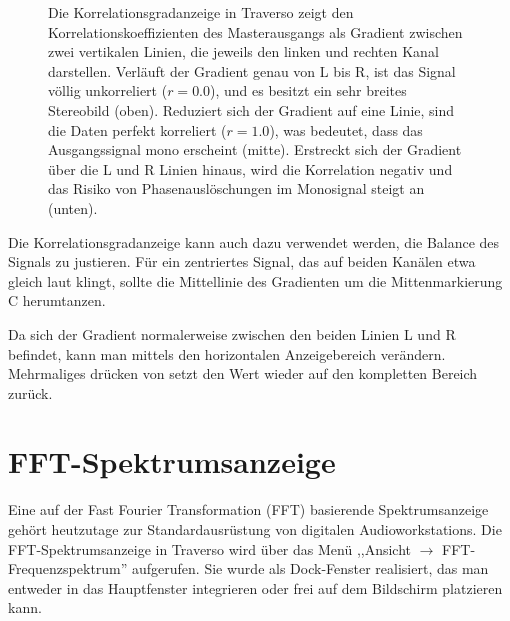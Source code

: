 \begin{figure}
	\centering
	\caption{Die Korrelationsgradanzeige in Traverso zeigt den Korrelationskoeffizienten des Masterausgangs als Gradient zwischen zwei vertikalen Linien, die jeweils den linken und rechten Kanal darstellen. Verläuft der Gradient genau von L bis R, ist das Signal völlig unkorreliert ($r = 0.0$), und es besitzt ein sehr breites Stereobild (oben). Reduziert sich der Gradient auf eine Linie, sind die Daten perfekt korreliert ($r = 1.0$), was bedeutet, dass das Ausgangssignal mono erscheint (mitte). Erstreckt sich der Gradient über die L und R Linien hinaus, wird die Korrelation negativ und das Risiko von Phasenauslöschungen im Monosignal steigt an (unten).}
	\label{fig_cmeter01}
\end{figure}

Die Korrelationsgradanzeige kann auch dazu verwendet werden, die Balance des Signals zu justieren. Für ein zentriertes Signal, das auf beiden Kanälen etwa gleich laut klingt, sollte die Mittellinie des Gradienten um die Mittenmarkierung C herumtanzen.

Da sich der Gradient normalerweise zwischen den beiden Linien L und R befindet, kann man mittels  den horizontalen Anzeigebereich verändern. Mehrmaliges drücken von  setzt den Wert wieder auf den kompletten Bereich zurück.

\section{FFT-Spektrumsanzeige}
Eine auf der Fast Fourier Transformation (FFT) basierende Spektrumsanzeige gehört heutzutage zur Standardausrüstung von digitalen Audioworkstations. Die FFT-Spektrumsanzeige in Traverso wird über das Menü ,,Ansicht $\rightarrow$ FFT-Frequenzspektrum'' aufgerufen. Sie wurde als Dock-Fenster realisiert, das man entweder in das Hauptfenster integrieren oder frei auf dem Bildschirm platzieren kann.

